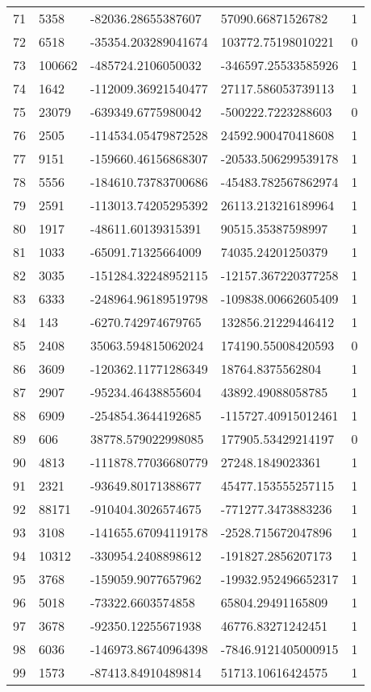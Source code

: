 \begin{longtable}{lllll}
    71 & 5358 & -82036.28655387607 & 57090.66871526782 & 1 \\
    72 & 6518 & -35354.203289041674 & 103772.75198010221 & 0 \\
    73 & 100662 & -485724.2106050032 & -346597.25533585926 & 1 \\
    74 & 1642 & -112009.36921540477 & 27117.586053739113 & 1 \\
    75 & 23079 & -639349.6775980042 & -500222.7223288603 & 0 \\
    76 & 2505 & -114534.05479872528 & 24592.900470418608 & 1 \\
    77 & 9151 & -159660.46156868307 & -20533.506299539178 & 1 \\
    78 & 5556 & -184610.73783700686 & -45483.782567862974 & 1 \\
    79 & 2591 & -113013.74205295392 & 26113.213216189964 & 1 \\
    80 & 1917 & -48611.60139315391 & 90515.35387598997 & 1 \\
    81 & 1033 & -65091.71325664009 & 74035.24201250379 & 1 \\
    82 & 3035 & -151284.32248952115 & -12157.367220377258 & 1 \\
    83 & 6333 & -248964.96189519798 & -109838.00662605409 & 1 \\
    84 & 143 & -6270.742974679765 & 132856.21229446412 & 1 \\
    85 & 2408 & 35063.594815062024 & 174190.55008420593 & 0 \\
    86 & 3609 & -120362.11771286349 & 18764.8375562804 & 1 \\
    87 & 2907 & -95234.46438855604 & 43892.49088058785 & 1 \\
    88 & 6909 & -254854.3644192685 & -115727.40915012461 & 1 \\
    89 & 606 & 38778.579022998085 & 177905.53429214197 & 0 \\
    90 & 4813 & -111878.77036680779 & 27248.1849023361 & 1 \\
    91 & 2321 & -93649.80171388677 & 45477.153555257115 & 1 \\
    92 & 88171 & -910404.3026574675 & -771277.3473883236 & 1 \\
    93 & 3108 & -141655.67094119178 & -2528.715672047896 & 1 \\
    94 & 10312 & -330954.2408898612 & -191827.2856207173 & 1 \\
    95 & 3768 & -159059.9077657962 & -19932.952496652317 & 1 \\
    96 & 5018 & -73322.6603574858 & 65804.29491165809 & 1 \\
    97 & 3678 & -92350.12255671938 & 46776.83271242451 & 1 \\
    98 & 6036 & -146973.86740964398 & -7846.9121405000915 & 1 \\
    99 & 1573 & -87413.84910489814 & 51713.10616424575 & 1
\end{longtable}